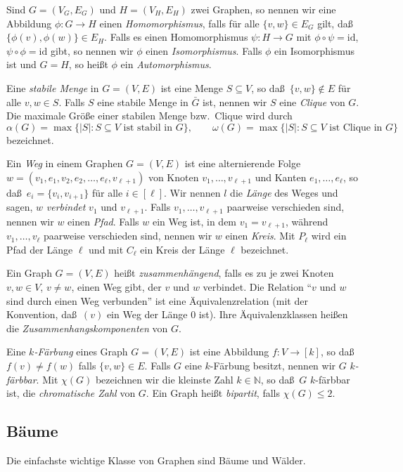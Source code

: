 \documentclass[10pt,reqno]{amsart}
\numberwithin{equation}{section}
\renewcommand\subset{\subseteq}
\newcommand\NN{\mathbb N}
\newcommand\id{\mathrm{id}}
\begin{document}
Sind $G=(V_G,E_G)$ und $H=(V_H,E_H)$ zwei Graphen, so nennen wir eine Abbildung $\phi:G\to H$ einen {\em Homomorphismus}, falls
f\"ur alle $\{v,w\}\in E_G$ gilt, da\ss\ $\{\phi(v),\phi(w)\}\in E_H$.
Falls es einen Homomorphismus $\psi:H\to G$ mit $\phi\circ\psi=\id$, $\psi\circ\phi=\id$ gibt, so nennen wir $\phi$ einen {\em Isomorphismus}.
Falls $\phi$ ein Isomorphismus ist und $G=H$, so hei\ss t $\phi$ ein {\em Automorphismus}.

Eine {\em stabile Menge} in $G=(V,E)$ ist eine Menge $S\subset V$, so da\ss\ $\{v,w\}\not\in E$ f\"ur alle $v,w\in S$.
Falls $S$ eine stabile Menge in $\bar G$ ist, nennen wir $S$ eine {\em Clique} von $G$.
Die maximale Gr\"o\ss e einer stabilen Menge bzw.\ Clique wird durch
	$$\alpha(G)=\max\{|S|:S\subset V\mbox{ ist stabil in }G\},\qquad
		\omega(G)=\max\{|S|:S\subset V\mbox{ ist Clique in }G\}$$
bezeichnet.

Ein {\em Weg} in einem Graphen $G=(V,E)$ ist eine alternierende Folge $w=(v_1,e_1,v_2,e_2,\ldots,e_\ell,v_{\ell+1})$ von Knoten $v_1,\ldots,v_{\ell+1}$
und Kanten $e_1,\ldots,e_\ell$, so da\ss\ $e_{i}=\{v_i,v_{i+1}\}$ f\"ur alle $i\in[\ell]$.
Wir nennen $l$ die {\em L\"ange} des Weges und sagen, $w$ {\em verbindet} $v_1$ und $v_{\ell+1}$.
Falls $v_1,\ldots,v_{\ell+1}$ paarweise verschieden sind, nennen wir $w$ einen {\em Pfad}.
Falls $w$ ein Weg ist, in dem $v_1=v_{\ell+1}$, w\"ahrend $v_1,\ldots,v_\ell$ paarweise verschieden sind, nennen wir $w$ einen {\em Kreis}.
Mit $P_\ell$ wird ein Pfad der L\"ange $\ell$ und mit $C_\ell$ ein Kreis der L\"ange $\ell$ bezeichnet.

Ein Graph $G=(V,E)$ hei\ss t {\em zusammenh\"angend}, falls es zu je zwei Knoten $v,w\in V$, $v\neq w$, einen Weg gibt, der $v$ und $w$ verbindet. 
Die Relation ``$v$ und $w$ sind durch einen Weg verbunden'' ist eine \"Aquivalenzrelation (mit der Konvention, da\ss\ $(v)$ ein Weg der L\"ange $0$ ist).
Ihre \"Aquivalenzklassen hei\ss en die {\em Zusammenhangskomponenten} von $G$.

Eine {\em $k$-F\"arbung} eines Graph $G=(V,E)$ ist eine Abbildung $f:V\to[k]$, so da\ss\ $f(v)\neq f(w)$ falls $\{v,w\}\in E$.
Falls $G$ eine $k$-F\"arbung besitzt, nennen wir $G$ {\em $k$-f\"arbbar}.
Mit $\chi(G)$ bezeichnen wir die kleinste Zahl $k\in\NN$, so da\ss\ $G$ $k$-f\"arbbar ist, die {\em chromatische Zahl} von $G$.
Ein Graph hei\ss t {\em bipartit}, falls $\chi(G)\leq2$.

\subsection{B\"aume}
Die einfachste wichtige Klasse von Graphen sind B\"aume und W\"alder.
\end{document}
